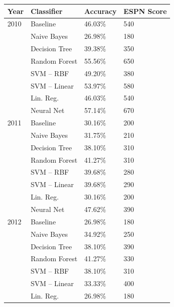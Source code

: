 \documentclass[]{article}
\begin{document}
\begin{table}[ht]
\centering
\begin{tabular}{@{}llll@{}}
\toprule
Year & Classifier           & Accuracy & ESPN Score \\ \midrule
2010 & Baseline             & 46.03\%         & 540           \\
     & Naive Bayes          & 26.98\%         & 180           \\
     & Decision Tree        & 39.38\%         & 350           \\
     & Random Forest        & 55.56\%         & 650           \\
     & SVM -- RBF           & 49.20\%         & 380           \\
     & SVM -- Linear        & 53.97\%         & 580           \\
     & Lin. Reg.            & 46.03\%         & 540           \\
     & Neural Net           & 57.14\%         & 670           \\ \midrule
2011 & Baseline             & 30.16\%         & 200           \\
     & Naive Bayes          & 31.75\%         & 210           \\
     & Decision Tree        & 38.10\%         & 310           \\
     & Random Forest        & 41.27\%         & 310           \\
     & SVM -- RBF           & 39.68\%         & 280           \\
     & SVM -- Linear        & 39.68\%         & 290           \\
     & Lin. Reg.            & 30.16\%         & 200           \\
     & Neural Net           & 47.62\%         & 390           \\ \midrule
2012 & Baseline             & 26.98\%         & 180           \\
     & Naive Bayes          & 34.92\%         & 250           \\
     & Decision Tree        & 38.10\%         & 390           \\
     & Random Forest        & 41.27\%         & 330           \\
     & SVM -- RBF           & 38.10\%         & 310           \\
     & SVM -- Linear        & 33.33\%         & 400           \\
     & Lin. Reg.            & 26.98\%         & 180           \\

\end{tabular}
\end{table}
\end{document}
